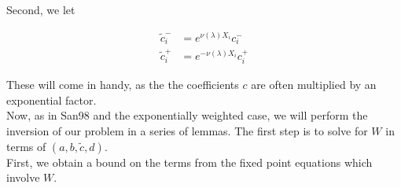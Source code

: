 \documentclass[12pt]{article}
\begin{document}
Second, we let

\begin{align*}
\tilde{c}_i^- &= e^{\nu(\lambda)X_i} c_i^- \\
\tilde{c}_i^+ &= e^{-\nu(\lambda)X_i} c_i^+
\end{align*}

These will come in handy, as the the coefficients $c$ are often multiplied by an exponential factor.\\

Now, as in San98 and the exponentially weighted case, we will perform the inversion of our problem in a series of lemmas. The first step is to solve for $W$ in terms of $(a, b, \tilde{c}, d)$.\\

First, we obtain a bound on the terms from the fixed point equations which involve $W$. 

\end{document}
